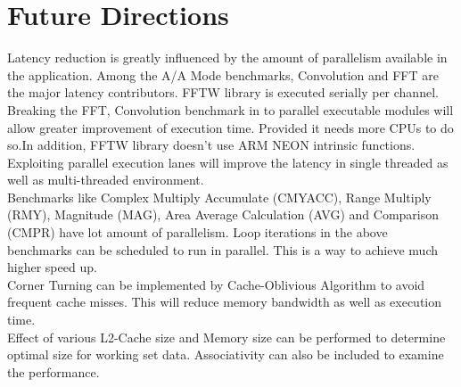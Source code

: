 \chapter{Future Directions}
\label{chap:future_directions}

Latency reduction is greatly influenced by the amount of parallelism available in the application. Among the A/A Mode benchmarks, Convolution and FFT are the major latency contributors. FFTW library is executed serially per channel.\\

Breaking the FFT, Convolution benchmark in to parallel executable modules will allow greater improvement of execution time. Provided it needs more CPUs to do so.In addition, FFTW library doesn't use ARM NEON intrinsic functions. Exploiting parallel execution lanes will improve the latency in single threaded as well as multi-threaded environment.\\

Benchmarks like Complex Multiply Accumulate (CMYACC), Range Multiply (RMY), Magnitude (MAG), Area Average Calculation (AVG) and Comparison (CMPR) have lot amount of parallelism. Loop iterations in the above benchmarks can be scheduled to run in parallel. This is a way to achieve much higher speed up. \\

Corner Turning can be implemented by Cache-Oblivious Algorithm to avoid frequent cache misses. This will reduce memory bandwidth as well as execution time.\\

Effect of various L2-Cache size and Memory size can be performed to determine optimal size for working set data. Associativity can also be included to examine the performance.  

%

